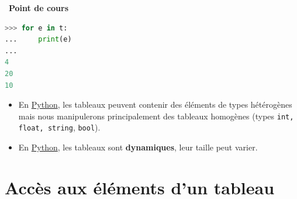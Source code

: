 \documentclass[
  11pt,
]{article}
\newcommand{\passthrough}[1]{#1}
\providecommand{\tightlist}{%
  \setlength{\itemsep}{0pt}\setlength{\parskip}{0pt}}
\newcounter{cours}
\newenvironment{cours}[1]
{\par \medskip   \addtocounter{cours}{1} \noindent  
\begin{bclogo}[arrondi =0.1,  ombre = true, barre=none, logo=\bcbook, marge=4]{~\textbf{Point de cours} \textbf{\thecours} {\itshape #1} }  \par}
{
\end{bclogo}
 \par \bigskip }
\begin{document}
\begin{cours}{}
\begin{lstlisting}[language=Python]
>>> for e in t:
...     print(e)
... 
4
20
10
\end{lstlisting}

\begin{itemize}
\tightlist
\item
  En
  \href{https://docs.python.org/3/tutorial/datastructures.html}{Python},
  les tableaux peuvent contenir des éléments de types hétérogènes mais
  nous manipulerons principalement des tableaux homogènes (types
  \passthrough{\lstinline!int, float, string!},
  \passthrough{\lstinline!bool!}).
\item
  En
  \href{https://docs.python.org/3/tutorial/datastructures.html}{Python},
  les tableaux sont \textbf{dynamiques}, leur taille peut varier.
\end{itemize}

\end{cours}

\hypertarget{accuxe8s-aux-uxe9luxe9ments-dun-tableau}{%
\section{Accès aux éléments d'un
tableau}\label{accuxe8s-aux-uxe9luxe9ments-dun-tableau}}
\end{document}
